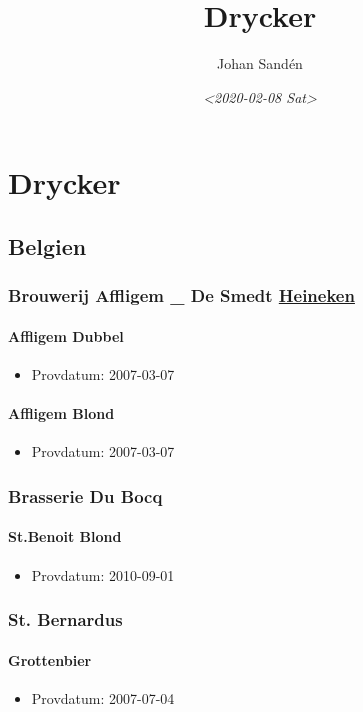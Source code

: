 \documentclass[11pt]{article}
\author{Johan Sandén}
\date{\textit{<2020-02-08 Sat>}}
\title{Drycker}
\begin{document}
\maketitle
\tableofcontents


\section{Drycker}
\label{sec:org366f903}
\subsection{Belgien}
\label{sec:orgef2f10c}
\subsubsection{Brouwerij Affligem \_ De Smedt \underline{Heineken}}
\label{sec:org4bea8c5}
\paragraph{Affligem Dubbel}
\label{sec:org5769bb7}
\begin{itemize}
\item Provdatum: 2007-03-07
\end{itemize}
\paragraph{Affligem Blond}
\label{sec:orgae9e993}
\begin{itemize}
\item Provdatum: 2007-03-07
\end{itemize}
\subsubsection{Brasserie Du Bocq}
\label{sec:org1aec173}
\paragraph{St.Benoit Blond}
\label{sec:orgb06f4d4}
\begin{itemize}
\item Provdatum: 2010-09-01
\end{itemize}
\subsubsection{St. Bernardus}
\label{sec:org36a5219}
\paragraph{Grottenbier}
\label{sec:org9899cb6}
\begin{itemize}
\item Provdatum: 2007-07-04
\end{itemize}
\end{document}
